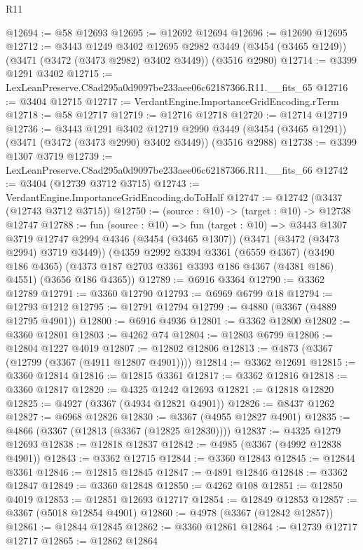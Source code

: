 \begin{lexlean}{R11}
\begin{coremodule}
@12694 := @58 @12693
@12695 := @12692 @12694
@12696 := @12690 @12695
@12712 := @3443
    @1249
    @3402
    @12695
    @2982
    @3449
    (@3454 (@3465 @1249))
    (@3471 (@3472 (@3473 @2982) @3402 @3449))
    (@3516 @2980)
@12714 := @3399 @1291 @3402
@12715 := LexLeanPreserve.C8ad295a0d9097be233aee06c62187366.R11.__fits_65
@12716 := @3404 @12715
@12717 := VerdantEngine.ImportanceGridEncoding.rTerm
@12718 := @58 @12717
@12719 := @12716 @12718
@12720 := @12714 @12719
@12736 := @3443
    @1291
    @3402
    @12719
    @2990
    @3449
    (@3454 (@3465 @1291))
    (@3471 (@3472 (@3473 @2990) @3402 @3449))
    (@3516 @2988)
@12738 := @3399 @1307 @3719
@12739 := LexLeanPreserve.C8ad295a0d9097be233aee06c62187366.R11.__fits_66
@12742 := @3404 (@12739 @3712 @3715)
@12743 := VerdantEngine.ImportanceGridEncoding.doToHalf
@12747 := @12742 (@3437 (@12743 @3712 @3715))
@12750 := (source : @10) -> (target : @10) -> @12738 @12747
@12788 := fun (source : @10) =>
  fun (target : @10) =>
  @3443
    @1307
    @3719
    @12747
    @2994
    @4346
    (@3454 (@3465 @1307))
    (@3471 (@3472 (@3473 @2994) @3719 @3449))
    (@4359
      @2992
      @3394
      @3361
      (@6559 @4367)
      (@3490 @186 @4365)
      (@4373 @187 @2703 @3361 @3393 @186 @4367 (@4381 @186) @4551)
      (@3656 @186 @4365))
@12789 := @6916 @3364
@12790 := @3362 @12789
@12791 := @3360 @12790
@12793 := @6969 @6799 @18
@12794 := @12793 @1212
@12795 := @12791 @12794
@12799 := @4880 (@3367 (@4889 @12795 @4901))
@12800 := @6916 @4936
@12801 := @3362 @12800
@12802 := @3360 @12801
@12803 := @4262 @74
@12804 := @12803 @6799
@12806 := @12804 @1227 @4019
@12807 := @12802 @12806
@12813 := @4873 (@3367 (@12799 (@3367 (@4911 @12807 @4901))))
@12814 := @3362 @12691
@12815 := @3360 @12814
@12816 := @12815 @3361
@12817 := @3362 @12816
@12818 := @3360 @12817
@12820 := @4325 @1242 @12693
@12821 := @12818 @12820
@12825 := @4927 (@3367 (@4934 @12821 @4901))
@12826 := @8437 @1262
@12827 := @6968 @12826
@12830 := @3367 (@4955 @12827 @4901)
@12835 := @4866 (@3367 (@12813 (@3367 (@12825 @12830))))
@12837 := @4325 @1279 @12693
@12838 := @12818 @12837
@12842 := @4985 (@3367 (@4992 @12838 @4901))
@12843 := @3362 @12715
@12844 := @3360 @12843
@12845 := @12844 @3361
@12846 := @12815 @12845
@12847 := @4891 @12846
@12848 := @3362 @12847
@12849 := @3360 @12848
@12850 := @4262 @108
@12851 := @12850 @4019
@12853 := @12851 @12693 @12717
@12854 := @12849 @12853
@12857 := @3367 (@5018 @12854 @4901)
@12860 := @4978 (@3367 (@12842 @12857))
@12861 := @12844 @12845
@12862 := @3360 @12861
@12864 := @12739 @12717 @12717
@12865 := @12862 @12864

\end{coremodule}
\end{lexlean}
